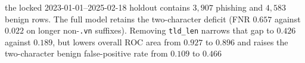 the locked 2023-01-01--2025-02-18 holdout contains $3{,}907$ phishing and $4{,}583$ benign rows. The full model retains the two-character deficit (FNR $0.657$ against $0.022$ on longer non-\texttt{.vn} suffixes). Removing \texttt{tld\_len} narrows that gap to $0.426$ against $0.189$, but lowers overall ROC area from $0.927$ to $0.896$ and raises the two-character benign false-positive rate from $0.109$ to $0.466$%
